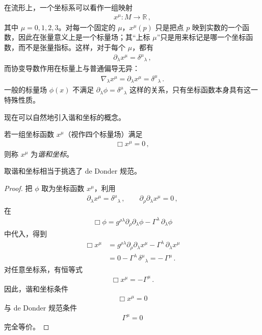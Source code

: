 \begin{derivationnote}
在流形上，一个坐标系可以看作一组映射
\begin{align}
x^{\mu} : M \longrightarrow \mathbb{R}\,,
\end{align}
其中 $\mu=0,1,2,3$。对每一个固定的 $\mu$，$x^{\mu}(p)$ 只是把点 $p$ 映到实数的一个函数，因此在张量意义上是一个标量场；其“上标 $\mu$”只是用来标记是哪一个坐标函数，而不是张量指标。这样，对于每个 $\mu$，都有
\begin{align}
\partial_{\lambda}x^{\mu} = \delta^{\mu}{}_{\lambda}\,,
\end{align}
而协变导数作用在标量上与普通偏导无异：
\begin{align}
\nabla_{\lambda}x^{\mu} = \partial_{\lambda}x^{\mu} = \delta^{\mu}{}_{\lambda}\,.
\end{align}
一般的标量场 $\phi(x)$ 不满足 $\partial_{\lambda}\phi = \delta^{\mu}{}_{\lambda}$ 这样的关系，只有坐标函数本身具有这一特殊性质。
\end{derivationnote}

现在可以自然地引入谐和坐标的概念。

\begin{definition}[谐和坐标]
若一组坐标函数 $x^{\mu}$（视作四个标量场）满足
\begin{align}
\Box x^{\mu} = 0\,,
\end{align}
则称 $x^{\mu}$ 为\emph{谐和坐标}。
\end{definition}

\begin{theorem}
    取谐和坐标相当于挑选了 de Donder 规范。
\end{theorem}
\begin{proof}
    把 $\phi$ 取为坐标函数 $x^{\mu}$，利用
\begin{align}
\partial_{\lambda}x^{\mu} = \delta^{\mu}{}_{\lambda}\,,\qquad
\partial_{\rho}\partial_{\lambda}x^{\mu} = 0\,,
\end{align}
在
\begin{align}
\Box\phi
=
g^{\rho\lambda}\partial_{\rho}\partial_{\lambda}\phi
-
\Gamma^{\lambda}\,\partial_{\lambda}\phi
\end{align}
中代入，得到
\begin{align}
\Box x^{\mu}
&=
g^{\rho\lambda}\partial_{\rho}\partial_{\lambda}x^{\mu}
-
\Gamma^{\lambda}\,\partial_{\lambda}x^{\mu}
\\[0.3em]
&=
0
-
\Gamma^{\lambda}\,\delta^{\mu}{}_{\lambda}
= 
-\,\Gamma^{\mu}\,.
\end{align}
    对任意坐标系，有恒等式
    \begin{align}
        \Box x^{\mu} = -\Gamma^{\mu}\,.
    \end{align}
    因此，谐和坐标条件
    \begin{align}
        \Box x^{\mu} = 0
    \end{align}
    与 de Donder 规范条件
    \begin{align}
        \Gamma^{\mu} = 0
    \end{align}
    完全等价。
\end{proof}

